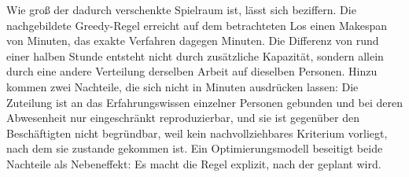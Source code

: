 Wie groß der dadurch verschenkte Spielraum ist, lässt sich beziffern. Die
nachgebildete Greedy-Regel erreicht auf dem betrachteten Los einen Makespan von
\MakespanGreedy{} Minuten, das exakte Verfahren dagegen \Optimum{} Minuten. Die
Differenz von rund einer halben Stunde entsteht nicht durch zusätzliche
Kapazität, sondern allein durch eine andere Verteilung derselben Arbeit auf
dieselben Personen. Hinzu kommen zwei Nachteile, die sich nicht in Minuten
ausdrücken lassen: Die Zuteilung ist an das Erfahrungswissen einzelner Personen
gebunden und bei deren Abwesenheit nur eingeschränkt reproduzierbar, und sie
ist gegenüber den Beschäftigten nicht begründbar, weil kein nachvollziehbares
Kriterium vorliegt, nach dem sie zustande gekommen ist. Ein Optimierungsmodell
beseitigt beide Nachteile als Nebeneffekt: Es macht die Regel explizit, nach
der geplant wird.
